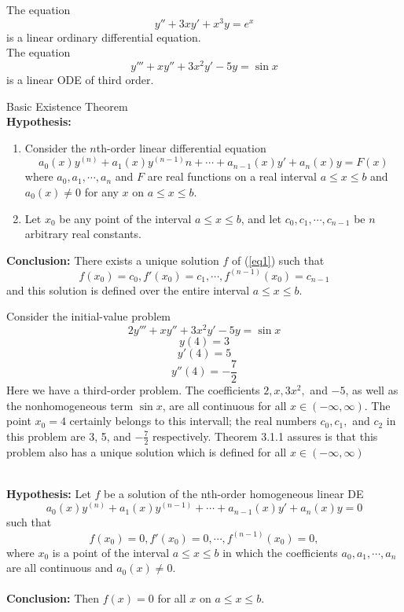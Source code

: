 \begin{example}{}{}
    The equation \[
        y'' + 3xy' + x^3y = e^x
    \] is a linear ordinary differential equation.\\
    The equation \[
        y''' + xy'' + 3x^2y' - 5y = \sin x
    \] is a linear ODE of third order.
\end{example}

\begin{theorem}{Basic Existence Theorem}{}
    \\\textbf{Hypothesis:}
    \begin{enumerate}
        \item Consider the $n$th-order linear differential equation
            \begin{equation}\tag{3.1.1}
                a_0(x)y^{(n)} + a_1(x)y^{(n-1)}n + \cdots + a_{n-1}(x)y' + a_n(x)y = F(x)
            \end{equation}
        where $a_0, a_1, \cdots, a_n$ and $F$ are real functions on a real interval $a \le x \le b$ and $a_0(x) \neq 0$ for any  $x$ on $a \le x \le b$.
        \item Let $x_0$ be any point of the interval $a \le x \le b$, and let $c_0, c_1, \cdots, c_{n-1}$ be $n$ arbitrary real constants.
    \end{enumerate}
    \textbf{Conclusion:} There exists a unique solution $f$ of (\ref{eq1}) such that \[
        f(x_0) = c_0, f'(x_0) = c_1, \cdots, f^{(n-1)}(x_0) = c_{n-1}
    \]
    and this solution is defined over the entire interval $a \le x \le b$.
\end{theorem}

\begin{example}{
    Consider the initial-value problem
    \[ 2y''' + xy'' + 3x^2y' - 5y = \sin x \]
    \[ y(4)=3 \]
    \[ y'(4)=5 \]
    \[ y''(4)=-\frac{7}{2} \]
}{} \vspace{-10pt}
    Here we have a third-order problem. The coefficients $2, x, 3x^2,$ and $-5$, as well as the nonhomogeneous term $\sin{x}$, are all continuous for all $x \in (-\infty,\infty)$. The point $x_0=4$ certainly belongs to this intervall; the real numbers $c_0, c_1, $ and $c_2$ in this problem are 3, 5, and  $-\frac{7}{2}$ respectively. Theorem 3.1.1 assures is that this problem also has a unique solution which is defined for all $x \in (-\infty,\infty)$
\end{example}

\begin{corollary}{}{}
    \\\textbf{Hypothesis:} Let $f$ be a solution of the nth-order homogeneous linear DE
    \begin{equation}\tag{3.1.2}
        a_0(x)y^{(n)} + a_1(x)y^{(n-1)} + \cdots + a_{n-1}(x)y' + a_n(x)y = 0
    \end{equation}
    such that \[
        f(x_0)=0, f'(x_0)=0, \cdots, f^{(n-1)}(x_0)=0,
    \] where $x_0$ is a point of the interval $a \le x \le b$ in which the coefficients $a_0, a_1, \cdots, a_n$ are all continuous and $a_0(x) \neq 0$. \\~\\
    \textbf{Conclusion:} Then $f(x)=0$ for all $x$ on $a \le x \le b$.
\end{corollary}

